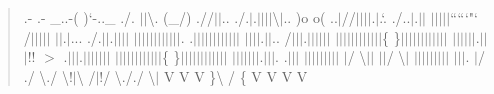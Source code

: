\begin{quote}
.-\/ .-\/ \+\_\+..-\/\textquotesingle{}( )`-\/..\+\_\+ ./\textquotesingle{}. \textquotesingle{}$\vert$$\vert$\textbackslash{}. (\+\_\+/) .//$\vert$$\vert${\ttfamily .}. ./\textquotesingle{}.$\vert$\textquotesingle{}.\textquotesingle{}$\vert$$\vert$$\vert$$\vert$\textbackslash{}$\vert$.. )o o( ..$\vert$//$\vert$$\vert$$\vert$$\vert${\ttfamily .}$\vert$.`. ./\textquotesingle{}..$\vert$\textquotesingle{}.$\vert$$\vert$ $\vert$$\vert$$\vert$$\vert$$\vert$`````{\ttfamily \textquotesingle{}}"\textquotesingle{}` \textquotesingle{}\textquotesingle{}\textquotesingle{}\textquotesingle{}\textquotesingle{}\textquotesingle{}/$\vert$$\vert$$\vert$$\vert$$\vert$ $\vert$$\vert$.{\ttfamily $\vert$..}. ./\textquotesingle{}.$\vert$$\vert$\textquotesingle{}.$\vert$$\vert$$\vert$$\vert$ $\vert$$\vert$$\vert$$\vert$$\vert$$\vert$$\vert$$\vert$$\vert$$\vert$$\vert$$\vert$. .$\vert$$\vert$$\vert$$\vert$$\vert$$\vert$$\vert$$\vert$$\vert$$\vert$$\vert$$\vert$ $\vert$$\vert$$\vert$$\vert$.{\ttfamily $\vert$$\vert$.}. /\textquotesingle{}$\vert$$\vert$$\vert$\textquotesingle{}.$\vert$$\vert$$\vert$$\vert$$\vert$$\vert$ $\vert$$\vert$$\vert$$\vert$$\vert$$\vert$$\vert$$\vert$$\vert$$\vert$$\vert$$\vert$\{ \}$\vert$$\vert$$\vert$$\vert$$\vert$$\vert$$\vert$$\vert$$\vert$$\vert$$\vert$$\vert$ $\vert$$\vert$$\vert$$\vert$$\vert$$\vert$.{\ttfamily $\vert$$\vert$$\vert$}!! $>$ \textquotesingle{}.$\vert$$\vert$$\vert$\textquotesingle{}.$\vert$$\vert$$\vert$$\vert$$\vert$$\vert$$\vert$ $\vert$$\vert$$\vert$$\vert$$\vert$$\vert$$\vert$$\vert$$\vert$$\vert$$\vert$$\vert$\{ \}$\vert$$\vert$$\vert$$\vert$$\vert$$\vert$$\vert$$\vert$$\vert$$\vert$$\vert$$\vert$ $\vert$$\vert$$\vert$$\vert$$\vert$$\vert$$\vert$.{\ttfamily $\vert$$\vert$$\vert$.} \textquotesingle{}.$\vert$$\vert$$\vert$ $\vert$$\vert$$\vert$$\vert$$\vert$$\vert$$\vert$$\vert$$\vert$ $\vert$/\textquotesingle{} {\ttfamily \textbackslash{}$\vert$$\vert$} \textquotesingle{}\textquotesingle{}$\vert$$\vert$/\textquotesingle{}\textquotesingle{} {\ttfamily \textbackslash{}$\vert$ $\vert$$\vert$$\vert$$\vert$$\vert$$\vert$$\vert$$\vert$$\vert$ $\vert$$\vert$$\vert$.} $\vert$/\textquotesingle{} ./\textquotesingle{} {\ttfamily \textbackslash{}./ \textbackslash{}!$\vert$\textbackslash{} /$\vert$!/ \textbackslash{}./\textquotesingle{}}./ {\ttfamily \textbackslash{}$\vert$ V V V \}\textquotesingle{}}\textbackslash{} /\textquotesingle{} {\ttfamily \{ V V V } V \textquotesingle{} \textquotesingle{} \textquotesingle{} \end{quote}


